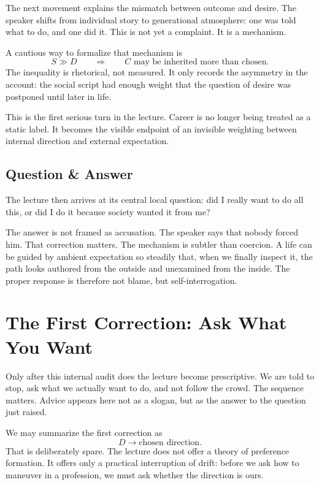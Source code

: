 The next movement explains the mismatch between outcome and desire. The speaker shifts from individual story to generational atmosphere: one was told what to do, and one did it. This is not yet a complaint. It is a mechanism.

A cautious way to formalize that mechanism is
\begin{equation}
S \gg D \qquad \Longrightarrow \qquad C \text{ may be inherited more than chosen.}
\end{equation}
The inequality is rhetorical, not measured. It only records the asymmetry in the account: the social script had enough weight that the question of desire was postponed until later in life.

This is the first serious turn in the lecture. Career is no longer being treated as a static label. It becomes the visible endpoint of an invisible weighting between internal direction and external expectation.

\subsection{Question \& Answer}

The lecture then arrives at its central local question: did I really want to do all this, or did I do it because society wanted it from me?

The answer is not framed as accusation. The speaker says that nobody forced him. That correction matters. The mechanism is subtler than coercion. A life can be guided by ambient expectation so steadily that, when we finally inspect it, the path looks authored from the outside and unexamined from the inside. The proper response is therefore not blame, but self-interrogation.

\section{The First Correction: Ask What You Want}

Only after this internal audit does the lecture become prescriptive. We are told to stop, ask what we actually want to do, and not follow the crowd. The sequence matters. Advice appears here not as a slogan, but as the answer to the question just raised.

We may summarize the first correction as
\begin{equation}
D \longrightarrow \text{chosen direction}.
\end{equation}
That is deliberately spare. The lecture does not offer a theory of preference formation. It offers only a practical interruption of drift: before we ask how to maneuver in a profession, we must ask whether the direction is ours.

